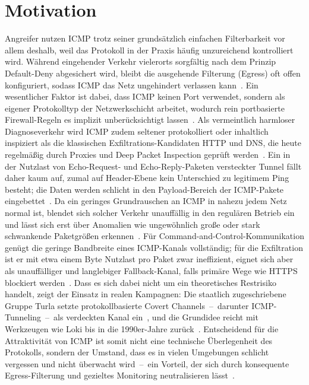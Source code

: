 \documentclass[11pt,a4paper]{article}
\begin{document}
\section{Motivation}
Angreifer nutzen ICMP trotz seiner grundsätzlich einfachen Filterbarkeit vor
allem deshalb, weil das Protokoll in der Praxis häufig unzureichend
kontrolliert wird. Während eingehender Verkehr vielerorts sorgfältig nach dem
Prinzip Default-Deny abgesichert wird, bleibt die ausgehende Filterung (Egress)
oft offen konfiguriert, sodass ICMP das Netz ungehindert verlassen
kann~\cite{praetorian, uva}. Ein wesentlicher Faktor ist dabei, dass ICMP keinen
Port verwendet, sondern als eigener Protokolltyp der Netzwerkschicht arbeitet,
wodurch rein portbasierte Firewall-Regeln es implizit unberücksichtigt
lassen~\cite{mitreT1095}. Als vermeintlich harmloser Diagnoseverkehr wird ICMP
zudem seltener protokolliert oder inhaltlich inspiziert als die klassischen
Exfiltrations-Kandidaten HTTP und DNS, die heute regelmäßig durch Proxies und
Deep Packet Inspection geprüft werden~\cite{praetorian, tum}. Ein in der Nutzlast
von Echo-Request- und Echo-Reply-Paketen versteckter Tunnel fällt daher kaum
auf, zumal auf Header-Ebene kein Unterschied zu legitimem Ping besteht; die
Daten werden schlicht in den Payload-Bereich der ICMP-Pakete
eingebettet~\cite{mitreT1572, elastic}. Da ein geringes Grundrauschen an ICMP in
nahezu jedem Netz normal ist, blendet sich solcher Verkehr unauffällig in den
regulären Betrieb ein und lässt sich erst über Anomalien wie ungewöhnlich große
oder stark schwankende Paketgrößen erkennen~\cite{elastic, vectra}. Für
Command-and-Control-Kommunikation genügt die geringe Bandbreite eines
ICMP-Kanals vollständig; für die Exfiltration ist er mit etwa einem Byte
Nutzlast pro Paket zwar ineffizient, eignet sich aber als unauffälliger und
langlebiger Fallback-Kanal, falls primäre Wege wie HTTPS blockiert
werden~\cite{praetorian, mitreT1048}. Dass es sich dabei nicht um ein
theoretisches Restrisiko handelt, zeigt der Einsatz in realen Kampagnen: Die
staatlich zugeschriebene Gruppe Turla setzte protokollbasierte Covert
Channels~--~darunter ICMP-Tunneling~--~als verdeckten Kanal ein~\cite{mitreTurla},
und die Grundidee reicht mit Werkzeugen wie Loki bis in die 1990er-Jahre
zurück~\cite{loki, tum}. Entscheidend für die Attraktivität von ICMP ist somit
nicht eine technische Überlegenheit des Protokolls, sondern der Umstand, dass es
in vielen Umgebungen schlicht vergessen und nicht überwacht wird~--~ein Vorteil,
der sich durch konsequente Egress-Filterung und gezieltes Monitoring
neutralisieren lässt~\cite{uva, vectra}.
\end{document}
